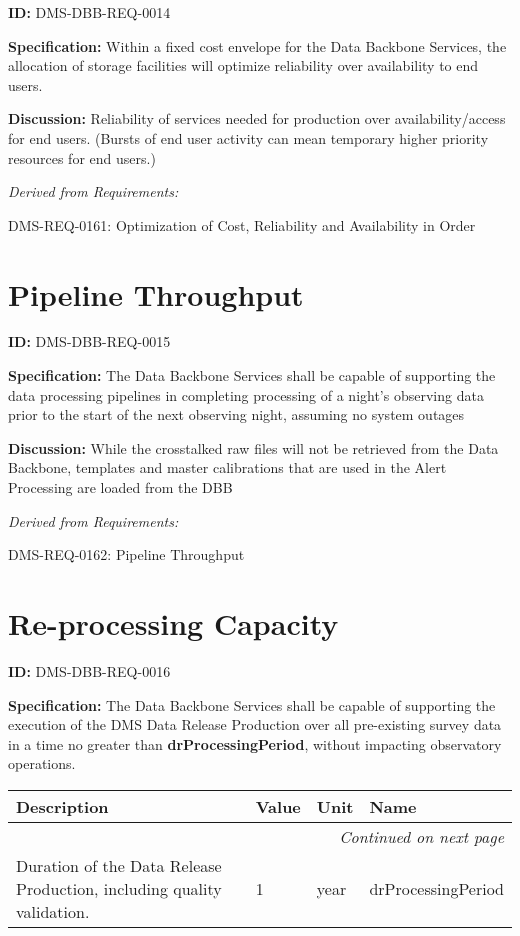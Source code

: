\documentclass[SE,toc,lsstdraft]{lsstdoc}
\makeatletter
\newcommand{\paramname}[1]{\hspace{0pt}#1}
\newcommand{\unitname}[1]{\hspace{0pt}#1}
\newenvironment{parameters}[0]{%
\setlength\LTleft{0pt}
\setlength\LTright{\fill}
\begin{small}
\begin{longtable}[]{|p{0.49\textwidth}|l|p{0.6in}|p{1.70in}@{}|}

\hline \textbf{Description} & \textbf{Value} & \textbf{Unit} & \textbf{Name} \\ \hline
\endhead

\hline \multicolumn{4}{r}{\emph{Continued on next page}} \\
\endfoot

\hline\hline
\endlastfoot
}{%
\hline
\end{longtable}
\end{small}
}
\makeatother
\begin{document}
\label{DMS-DBB-REQ-0014}
\textbf{ID:} DMS-DBB-REQ-0014

\textbf{Specification:}
Within a fixed cost envelope for the Data Backbone Services, the allocation of storage facilities will optimize reliability over availability to end users.

\textbf{Discussion:}
Reliability of services needed for production over availability/access for end users. (Bursts of end user activity can mean temporary higher priority resources for end users.)

\emph{Derived from Requirements:}

DMS-REQ-0161:
Optimization of Cost, Reliability and Availability in Order \newline

\section{Pipeline Throughput}

\label{DMS-DBB-REQ-0015}
\textbf{ID:} DMS-DBB-REQ-0015

\textbf{Specification:}
The Data Backbone Services shall be capable of supporting the data processing pipelines in completing processing of a night’s observing data prior to the start of the next observing night, assuming no system outages

\textbf{Discussion:}
While the crosstalked raw files will not be retrieved from the Data Backbone, templates and master calibrations that are used in the Alert Processing are loaded from the DBB

\emph{Derived from Requirements:}

DMS-REQ-0162:
Pipeline Throughput \newline

\section{Re-processing Capacity}

\label{DMS-DBB-REQ-0016}
\textbf{ID:} DMS-DBB-REQ-0016

\textbf{Specification:}
The Data Backbone Services shall be capable of supporting the execution of the DMS Data Release Production over all pre-existing survey data in a time no greater than \textbf{drProcessingPeriod}, without impacting observatory operations.

\begin{parameters}
Duration of the Data Release Production, including quality validation.
&
1
&
\unitname{%
year
}
&
\paramname{%
drProcessingPeriod
} \\\hline
\end{parameters}
\end{document}
